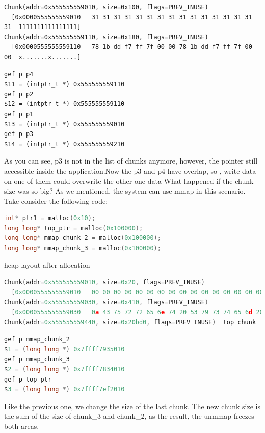 \documentclass{masterthesis}
\begin{document}
\begin{lstlisting}[frame=tlrb]
Chunk(addr=0x555555559010, size=0x100, flags=PREV_INUSE)
  [0x0000555555559010   31 31 31 31 31 31 31 31 31 31 31 31 31 31 31 31  1111111111111111]
Chunk(addr=0x555555559110, size=0x180, flags=PREV_INUSE)
  [0x0000555555559110   78 1b dd f7 ff 7f 00 00 78 1b dd f7 ff 7f 00 00  x.......x.......]
\end{lstlisting}

\begin{lstlisting}[frame=tlrb]   
gef p p4
$11 = (intptr_t *) 0x555555559110
gef p p2
$12 = (intptr_t *) 0x555555559110
gef p p1
$13 = (intptr_t *) 0x555555559010
gef p p3
$14 = (intptr_t *) 0x555555559210
\end{lstlisting}
  
As you can see, p3 is not in the list of chunks anymore, however, the pointer still accessible inside the application.Now the p3 and p4 have overlap, so , write data on one of them could overwrite the other one data
What happened if the chunk size was so big? As we mentioned, the system can use mmap in this scenario. Take consider the following code: 

\begin{lstlisting}[language=c,frame=tlrb]
int* ptr1 = malloc(0x10);
long long* top_ptr = malloc(0x100000);
long long* mmap_chunk_2 = malloc(0x100000);
long long* mmap_chunk_3 = malloc(0x100000);
\end{lstlisting}

heap layout after allocation 

\begin{lstlisting}[language=c,frame=tlrb]
Chunk(addr=0x555555559010, size=0x20, flags=PREV_INUSE)
  [0x0000555555559010   00 00 00 00 00 00 00 00 00 00 00 00 00 00 00 00  ................]
Chunk(addr=0x555555559030, size=0x410, flags=PREV_INUSE)
  [0x0000555555559030   0a 43 75 72 72 65 6e 74 20 53 79 73 74 65 6d 20  .Current System ]
Chunk(addr=0x555555559440, size=0x20bd0, flags=PREV_INUSE)  top chunk
\end{lstlisting}

\begin{lstlisting}[language=c,frame=tlrb]
gef p mmap_chunk_2
$1 = (long long *) 0x7ffff7935010
gef p mmap_chunk_3
$2 = (long long *) 0x7ffff7834010
gef p top_ptr
$3 = (long long *) 0x7ffff7ef2010
\end{lstlisting}

Like the previous one, we change the size of the last chunk. The new chunk size is the sum of the size of chunk\_3 and chunk\_2, as the result, the unmmap freezes both areas.
\end{document}
